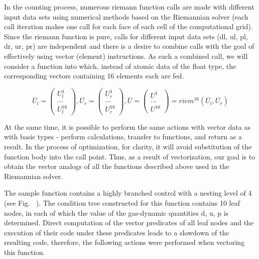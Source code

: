 \documentclass[
11pt,%
tightenlines,%
twoside,%
onecolumn,%
nofloats,%
nobibnotes,%
nofootinbib,%
superscriptaddress,%
noshowpacs,%
centertags]%
{revtex4}
\begin{document}
In the counting process, numerous riemann function calls are made with different input data sets using numerical methods based on the Riemannian solver (each call iteration makes one call for each face of each cell of the computational grid). Since the riemann function is pure, calls for different input data sets (dl, ul, pl, dr, ur, pr) are independent and there is a desire to combine calls with the goal of effectively using vector (element) instructions. As such a combined call, we will consider a function into which, instead of atomic data of the float type, the corresponding vectors containing 16 elements each are fed.

\begin{equation}\label{eq:riemann_16}
\overline{U_l} = \left( \begin{array}{ccc} U_l^1 \\ ... \\ U_l^{16} \end{array} \right),
\overline{U_r} = \left( \begin{array}{ccc} U_r^1 \\ ... \\ U_r^{16} \end{array} \right),
\overline{U} = \left( \begin{array}{ccc} U^1 \\ ... \\ U^{16} \end{array} \right) = riem^{16}(\overline{U_l}, \overline{U_r})
\end{equation}

At the same time, it is possible to perform the same actions with vector data as with basic types - perform calculations, transfer to functions, and return as a result. In the process of optimization, for clarity, it will avoid substitution of the function body into the call point. Thus, as a result of vectorization, our goal is to obtain the vector analogs of all the functions described above used in the Riemannian solver.

The sample function contains a highly branched control with a nesting level of 4 (see Fig. ~). The condition tree constructed for this function contains 10 leaf nodes, in each of which the value of the gas-dynamic quantities d, u, p is determined. Direct computation of the vector predicates of all leaf nodes and the execution of their code under these predicates leads to a slowdown of the resulting code, therefore, the following actions were performed when vectoring this function.
\end{document}
